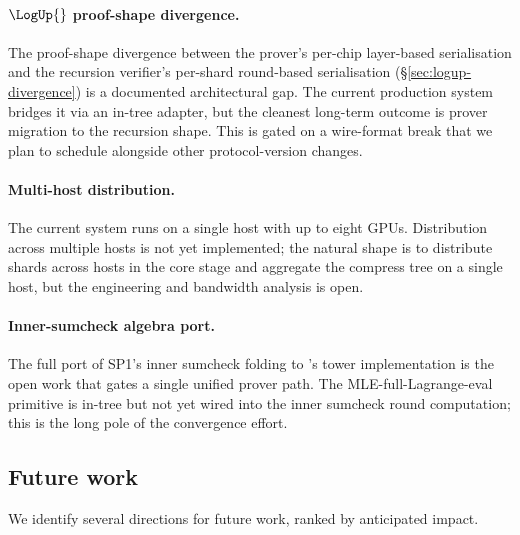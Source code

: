 \paragraph{$\LogUp{}$ proof-shape divergence.} The proof-shape divergence between the prover's per-chip layer-based serialisation and the recursion verifier's per-shard round-based serialisation (\S\ref{sec:logup-divergence}) is a documented architectural gap. The current production system bridges it via an in-tree adapter, but the cleanest long-term outcome is prover migration to the recursion shape. This is gated on a wire-format break that we plan to schedule alongside other protocol-version changes.

\paragraph{Multi-host distribution.} The current system runs on a single host with up to eight GPUs. Distribution across multiple hosts is not yet implemented; the natural shape is to distribute shards across hosts in the core stage and aggregate the compress tree on a single host, but the engineering and bandwidth analysis is open.

\paragraph{Inner-sumcheck algebra port.} The full port of SP1's inner sumcheck folding to \Ziren{}'s tower implementation is the open work that gates a single unified prover path. The MLE-full-Lagrange-eval primitive is in-tree but not yet wired into the inner sumcheck round computation; this is the long pole of the convergence effort.

\subsection{Future work}

We identify several directions for future work, ranked by anticipated impact.

